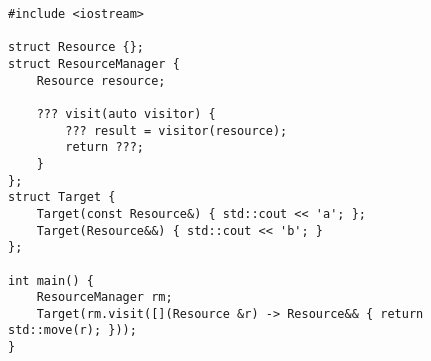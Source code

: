 \begin{lstlisting}[title=\href{https://godbolt.org/z/4HpECV}{\texttt{godbolt.org/z/4HpECV}}]
#include <iostream>

struct Resource {};
struct ResourceManager {
    Resource resource;

    ??? visit(auto visitor) {
        ??? result = visitor(resource);
        return ???;
    }
};
struct Target {
    Target(const Resource&) { std::cout << 'a'; };
    Target(Resource&&) { std::cout << 'b'; }
};

int main() {
    ResourceManager rm;
    Target(rm.visit([](Resource &r) -> Resource&& { return std::move(r); }));
}
\end{lstlisting}
